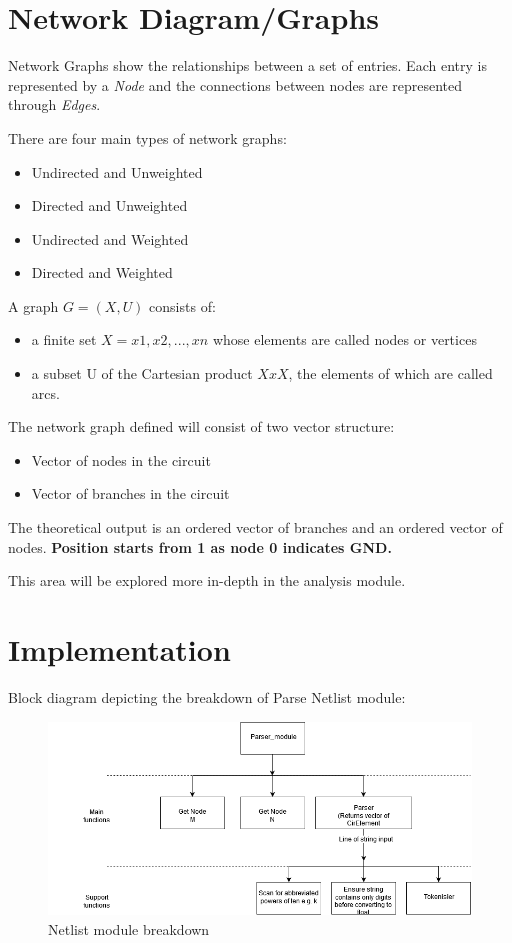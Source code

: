 \documentclass[a4paper, titlepage]{article}
\begin{document}
    \section{Network Diagram/Graphs}
    Network Graphs show the relationships between a set of entries. Each entry is represented by a \textit{Node} and the connections between nodes are represented through \textit{Edges}.
    \par
    There are four main types of network graphs:
    \begin{itemize}
        \item Undirected and Unweighted
        \item Directed and Unweighted
        \item Undirected and Weighted
        \item Directed and Weighted
    \end{itemize}
    \par
    A graph $G=(X,U)$ consists of: \cite{parse}
    \begin{itemize}
        \item a finite set $X = {x1,x2,...,xn}$ whose elements are called nodes or vertices
        \item a subset U of the Cartesian product $X x X$, the elements of which are called arcs.
    \end{itemize}
    The network graph defined will consist of two vector structure:
    \begin{itemize}
        \item Vector of nodes in the circuit
        \item Vector of branches in the circuit
    \end{itemize}
    The theoretical output is an ordered vector of branches and an ordered vector of nodes. 
    \textbf{Position starts from 1 as node 0 indicates GND.}
    \par
    This area will be explored more in-depth in the analysis module.
    \pagebreak

    \section{Implementation}
    Block diagram depicting the breakdown of Parse Netlist module:
    \begin{figure}[h]
    \centering
    \includegraphics[width=145mm,scale=1]{Netlist breakdown}
    \caption{Netlist module breakdown}
    \label{fig:Netlist breakdown}
    \end{figure}
\end{document}
